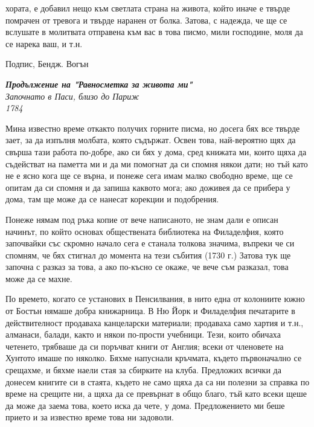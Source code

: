 \documentclass[12pt]{book}
\begin{document}
хората, е добавил нещо към светлата страна на живота, който иначе е твърде помрачен от тревога и твърде наранен от болка. Затова, с надежда, че ще се вслушате в молитвата отправена към вас в това писмо, мили господине, моля да се нарека ваш, и т.н.

Подпис, Бендж. Вогън


\textbf{\textit{Продължение на "Равносметка за живота ми"}}\\
\textit{Започнато в Паси, близо до Париж}\\
\textit{1784}

Мина известно време откакто получих горните писма, но досега бях все твърде зает, за да изпълня молбата, която съдържат. Освен това, най-вероятно щях да свърша тази работа по-добре, ако си бях у дома, сред книжата ми, които щяха да съдействат на паметта ми и да ми помогнат да си спомня някои дати; но тъй като не е ясно кога ще се върна, и понеже сега имам малко свободно време, ще се опитам да си спомня и да запиша каквото мога; ако доживея да се прибера у дома, там ще може да се нанесат корекции и подобрения. 

Понеже нямам под ръка копие от вече написаното, не знам дали е описан начинът, по който основах обществената библиотека на Филаделфия, която започвайки със скромно начало сега е станала толкова значима, въпреки че си спомням, че бях стигнал до момента на тези събития (1730 г.) Затова тук ще започна с разказ за това, а ако по-късно се окаже, че вече съм разказал, това може да се махне. 

По времето, когато се установих в Пенсилвания, в нито една от колониите южно от Бостън нямаше добра книжарница. В Ню Йорк и Филаделфия печатарите в действителност продаваха канцеларски материали; продаваха само хартия и т.н., алманаси, балади, както и някои по-прости учебници. Тези, които обичаха четенето, трябваше да си поръчват книги от Англия; всеки от членовете на Хунтото имаше по няколко. Бяхме напуснали кръчмата, където първоначално се срещахме, и бяхме наели стая за сбирките на клуба. Предложих всички да донесем книгите си в стаята, където не само щяха да са ни полезни за справка по време на срещите ни, а щяха да се превърнат в общо благо, тъй като всеки щеше да може да заема това, което иска да чете, у дома. Предложението ми беше прието и за известно време това ни задоволи.
\end{document}
